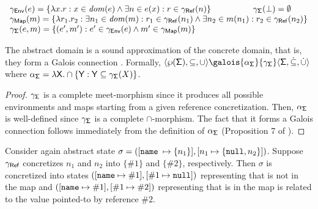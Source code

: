 \[
\begin{array}{l}
\gamma_{\mathsf{Env}}(e) = \{\lambda x . r : x \in \mathit{dom}(e) \land \exists n \in e(x) : r \in \gamma_{\mathsf{Ref}}(n)\}\hspace{50pt}\gamma_{\mathsf{\Sigma}}(\bot) =\emptyset\\
\gamma_{\mathsf{Map}}(m) = \{\lambda r_1 . r_2 : \exists n_1 \in \mathit{dom}(m) : r_1 \in \gamma_{\mathsf{Ref}}(n_1) \land \exists n_2 \in m(n_1) : r_2 \in \gamma_{\mathsf{Ref}}(n_2) \}\\
\gamma_{\mathsf{\Sigma}}(e, m) = \{(e', m') : e' \in \gamma_{\mathsf{Env}}(e) \land m' \in \gamma_{\mathsf{Map}}(m)\}\\
\end{array}
\]
\begin{lemma}
	The abstract domain is a sound approximation of the concrete domain, that is, they form a Galois connection \cite{CC77}. Formally, $\langle \wp(\state), \subseteq, \cup \rangle \galois{\alpha_\state}{\gamma_\state} \langle \astate, \dot{\subseteq}, \dot{\cup} \rangle$ where $\alpha_{\mathsf{\Sigma}} = \lambda \mathsf{X} . \cap \{\mathsf{Y} : \mathsf{Y} \subseteq \gamma_{\mathsf{\Sigma}}(X)\}$.
\begin{proof}

$\gamma_{\mathsf{\Sigma}}$ is a complete meet-morphism since it produces all possible environments and maps starting from a given reference concretization. Then, $\alpha_{\mathsf{\Sigma}}$ is well-defined since $\gamma_{\mathsf{\Sigma}}$ is a complete $\cap$-morphism. The fact that it forms a Galois connection follows immediately from the definition of $\alpha_{\mathsf{\Sigma}}$ (Proposition 7 of \cite{CC92}).
\end{proof}
\end{lemma}

\runex
Consider again abstract state $\sigma = ([\mathtt{name}$ $\mapsto \{n_1\}], [n_1 \mapsto \{\mathtt{null}, n_2\}])$. Suppose $\gamma_{\mathsf{Ref}}$ concretizes $n_1$ and $n_2$ into $\{\#1\}$ and $\{\#2\}$, respectively. Then $\sigma$ is concretized into states $([\mathtt{name} \mapsto \#1], [\#1 \mapsto \mathtt{null}])$ representing that  is not in the map and $([\mathtt{name} \mapsto \#1], [\#1 \mapsto \#2])$ representing that  is in the map is related to the value pointed-to by reference $\#2$.




